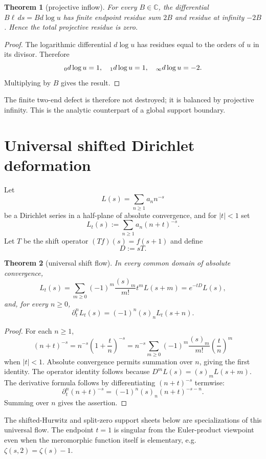 \documentclass[11pt]{article}
\newtheorem{theorem}{Theorem}[section]
\let\Res\relax
\DeclareMathOperator{\Res}{Res}
\newcommand{\C}{\mathbb C}
\begin{document}
\begin{theorem}[projective inflow]
For every $B\in\C$, the differential $B\ell\,ds=Bd\log u$ has finite endpoint
residue sum $2B$ and residue at infinity $-2B$.  Hence the total projective residue
is zero.
\end{theorem}

\begin{proof}
The logarithmic differential $d\log u$ has residues equal to the orders of $u$ in its
divisor.  Therefore
\[
\Res_{0}d\log u=1,
\quad
\Res_{1}d\log u=1,
\quad
\Res_{\infty}d\log u=-2.
\]
Multiplying by $B$ gives the result.
\end{proof}

The finite two-end defect is therefore not destroyed; it is balanced by projective
infinity.  This is the analytic counterpart of a global support boundary.


\section{Universal shifted Dirichlet deformation}

Let
\[
L(s)=\sum_{n\ge1}a_n n^{-s}
\]
be a Dirichlet series in a half-plane of absolute convergence, and for $|t|<1$ set
\[
L_t(s):=\sum_{n\ge1}a_n(n+t)^{-s}.
\]
Let $T$ be the shift operator $(Tf)(s)=f(s+1)$ and define
\[
D:=sT.
\]

\begin{theorem}[universal shift flow]
In every common domain of absolute convergence,
\[
L_t(s)=\sum_{m\ge0}(-1)^m\frac{(s)_m}{m!}t^mL(s+m)=e^{-tD}L(s),
\]
and, for every $n\ge0$,
\[
\partial_t^nL_t(s)=(-1)^n(s)_nL_t(s+n).
\]
\end{theorem}

\begin{proof}
For each $n\ge1$,
\[
(n+t)^{-s}=n^{-s}\left(1+\frac tn\right)^{-s}
=n^{-s}\sum_{m\ge0}(-1)^m\frac{(s)_m}{m!}\left(\frac tn\right)^m
\]
when $|t|<1$.  Absolute convergence permits summation over $n$, giving the first
identity.  The operator identity follows because $D^mL(s)=(s)_mL(s+m)$.  The
derivative formula follows by differentiating $(n+t)^{-s}$ termwise:
\[
\partial_t^n(n+t)^{-s}=(-1)^n(s)_n(n+t)^{-s-n}.
\]
Summing over $n$ gives the assertion.
\end{proof}

The shifted-Hurwitz and split-zero support sheets below are specializations of this
universal flow.  The endpoint $t=1$ is singular from the Euler-product viewpoint even
when the meromorphic function itself is elementary, e.g. $\zeta(s,2)=\zeta(s)-1$.
\end{document}
